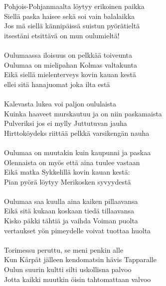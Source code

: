
Pohjois-Pohjanmaalta löytyy erikoinen paikka \\
Siellä paska haisee sekä soi vain balalaikka \\
Jos mä siellä kännipäissä suistun pyörätieltä \\
itsestäni etsittävä on mun oulumieltä! \\
\hspace{10mm} \\
Oulumaassa iloisuus on pelkkää toiveunta \\
Oulumaa on mielipahan Kolmas valtakunta \\
Eikä siellä mielenterveys kovin kauan kestä \\
ellei sitä hanajuomat joka ilta estä \\
\hspace{10mm} \\
Kalevasta lukea voi paljon oululaista \\
Kuinka haaveet murskautuu ja on niin paskamaista \\
Pulveriksi jos ei mylly Juttutuvan jauha \\
Hirttoköydeks riittää pelkkä varsikengän nauha \\
\hspace{10mm} \\
Oulumaa on muutakin kuin kaupunni ja paskaa \\
Olennaista on myös että aina tuulee vastaan \\
Eikä matka Sykkelillä kovin kauan kestä: \\
Pian pyörä löytyy Merikosken syvyydestä \\
\hspace{10mm} \\
Oulumaa saa kuulla aina kaiken pillaavansa \\
Eikä sitä kukaan koskaan tiedä tillaavansa \\
Kisko päkki tähtiä ja vaihda Voiman puolta \\
vertaukset yön pimeydelle voivat tuottaa huolta \\
\hspace{10mm} \\
Torimessu peruttu, se meni penkin alle \\
Kun Kärpät jälleen kendomatsin hävis Tapparalle \\
Oulun suurin kultti silti uskollisna palvoo \\
Jotta kaikki muutkin öisin tahtomattaan valvoo \\
